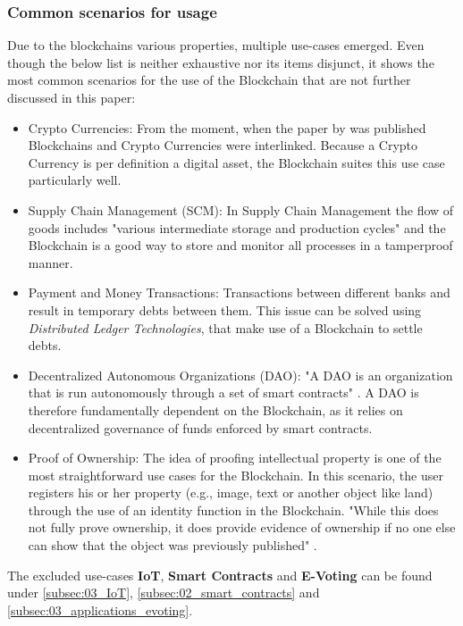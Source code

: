 \subsubsection{Common scenarios for usage}
Due to the blockchains various properties, multiple use-cases emerged. Even though the below list is neither exhaustive nor its items disjunct, it shows the most common scenarios for the use of the Blockchain\cite{Wust2017} that are not further discussed in this paper:
\begin{itemize}
  \item Crypto Currencies: From the moment, when the paper by \citeauthor{Nakamoto2009} was published Blockchains and Crypto Currencies were interlinked. Because a Crypto Currency is per definition a digital asset, the Blockchain suites this use case particularly well.
  \item Supply Chain Management (SCM): In Supply Chain Management the flow of goods includes "various intermediate storage and production cycles" \cite{Wust2017} and the Blockchain is a good way to store and monitor all processes in a tamperproof manner.
  \item Payment and Money Transactions: Transactions between different banks and result in temporary debts between them. This issue can be solved using \textit{Distributed Ledger Technologies}, that make use of a Blockchain to settle debts. 
  \item Decentralized Autonomous Organizations (DAO): "A DAO is an organization that is run autonomously through a set of smart contracts" \cite{Wust2017}. A DAO is therefore fundamentally dependent on the Blockchain, as it relies on decentralized governance of funds enforced by smart contracts.
  \item Proof of Ownership: The idea of proofing intellectual property is one of the most straightforward use cases for the Blockchain. In this scenario, the user registers his or her property (e.g., image, text or another object like land) through the use of an identity function in the Blockchain. "While this does not fully prove ownership, it does provide evidence of ownership if no one else can show that the object was previously published" \cite{Wust2017}.   
\end{itemize}
The excluded use-cases \textbf{IoT}, \textbf{Smart Contracts} and \textbf{E-Voting} can be found under \ref{subsec:03_IoT}, \ref{subsec:02_smart_contracts} and \ref{subsec:03_applications_evoting}.

